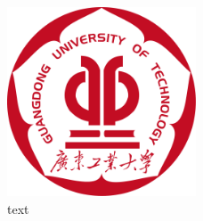 \begin{figure}[h]
    \centering
    \includegraphics[width=0.5\textwidth]{figures/logo.pdf}
    \caption{text}
\end{figure}

